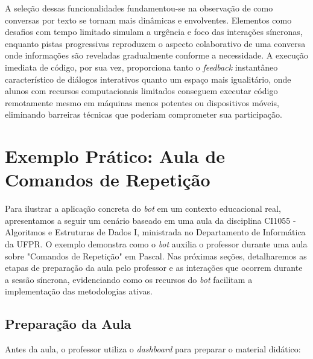 A seleção dessas funcionalidades fundamentou-se na observação de como conversas
por texto se tornam mais dinâmicas e envolventes. Elementos como desafios com
tempo limitado simulam a urgência e foco das interações síncronas, enquanto
pistas progressivas reproduzem o aspecto colaborativo de uma conversa onde
informações são reveladas gradualmente conforme a necessidade. A execução
imediata de código, por sua vez, proporciona tanto o \textit{feedback}
instantâneo característico de diálogos interativos quanto um espaço mais
igualitário, onde alunos com recursos computacionais limitados conseguem
executar código remotamente mesmo em máquinas menos potentes ou dispositivos
móveis, eliminando barreiras técnicas que poderiam comprometer sua
participação\cite{fabiane2024}.

\section{Exemplo Prático: Aula de Comandos de Repetição}
\label{sec:exemplo}

Para ilustrar a aplicação concreta do \textit{bot} em um contexto educacional
real, apresentamos a seguir um cenário baseado em uma aula da disciplina CI1055
- Algoritmos e Estruturas de Dados I, ministrada no Departamento de Informática
da UFPR. O exemplo demonstra como o \textit{bot} auxilia o professor durante uma
aula sobre "Comandos de Repetição" em Pascal. Nas próximas seções, detalharemos
as etapas de preparação da aula pelo professor e as interações que ocorrem
durante a sessão síncrona, evidenciando como os recursos do \textit{bot}
facilitam a implementação das metodologias ativas.

\subsection{Preparação da Aula}
\label{subsec:preparacao}

Antes da aula, o professor utiliza o \textit{dashboard} para preparar o material
didático:

